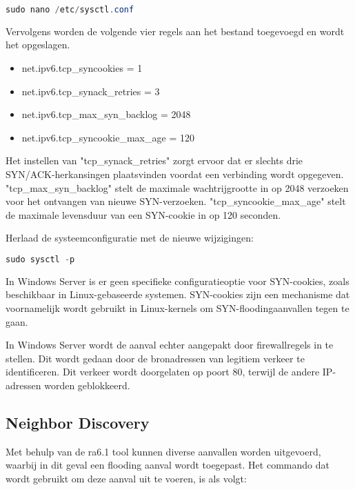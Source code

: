 \begin{lstlisting}[language=PowerShell,style=PowerShellStyle]
    sudo nano /etc/sysctl.conf
\end{lstlisting}
Vervolgens worden de volgende vier regels aan het bestand toegevoegd en wordt het opgeslagen.
\begin{itemize}
     
    \item  net.ipv6.tcp\_syncookies = 1
    \item  net.ipv6.tcp\_synack\_retries = 3
    \item  net.ipv6.tcp\_max\_syn\_backlog = 2048
    \item  net.ipv6.tcp\_syncookie\_max\_age = 120
    
\end{itemize}


Het instellen van "tcp\_synack\_retries" zorgt ervoor dat er slechts drie \newline SYN/ACK-herkansingen plaatsvinden voordat een verbinding wordt opgegeven. \newline "tcp\_max\_syn\_backlog" stelt de maximale wachtrijgrootte in op 2048 verzoeken voor het ontvangen van nieuwe SYN-verzoeken. "tcp\_syncookie\_max\_age" stelt de maximale levensduur van een SYN-cookie in op 120 seconden.

Herlaad de systeemconfiguratie met de nieuwe wijzigingen:
\begin{lstlisting}[language=PowerShell,style=PowerShellStyle]
    sudo sysctl -p
\end{lstlisting}

In Windows Server is er geen specifieke configuratieoptie voor SYN-cookies, zoals beschikbaar in Linux-gebaseerde systemen. SYN-cookies zijn een mechanisme dat voornamelijk wordt gebruikt in Linux-kernels om SYN-floodingaanvallen tegen te gaan.
\newline

In Windows Server wordt de aanval echter aangepakt door firewallregels in te stellen. Dit wordt gedaan door de bronadressen van legitiem verkeer te identificeren. Dit verkeer wordt doorgelaten op poort 80, terwijl de andere IP-adressen worden geblokkeerd.

\subsection{Neighbor Discovery}

Met behulp van de ra6.1 tool kunnen diverse aanvallen worden uitgevoerd, waarbij in dit geval een flooding aanval wordt toegepast. Het commando dat wordt gebruikt om deze aanval uit te voeren, is als volgt:

